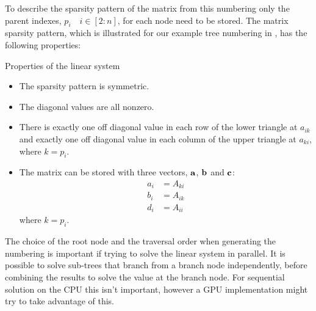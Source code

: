 To describe the sparsity pattern of the matrix from this numbering only the parent indexes, $p_i\quad i\in[2:n]$, for each node need to be stored. The matrix sparsity pattern, which is illustrated for our example tree numbering in , has the following properties:
\begin{infobox}{Properties of the linear system}
\begin{itemize}[leftmargin=*]
    \item
        The sparsity pattern is symmetric.
    \item
        The diagonal values are all nonzero.
    \item
        There is exactly one off diagonal value in each row of the lower triangle at $a_{ik}$ and exactly one off diagonal value in each column of the upper triangle at $a_{ki}$, where $k=p_i$.
    \item
        The matrix can be stored with three vectors, $\mathbf{a}$, $\mathbf{b}$ and $\mathbf{c}$:
        \begin{align}
            a_i &= A_{ki} \\
            b_i &= A_{ik} \\
            d_i &= A_{ii}
        \end{align}
        where $k=p_i$.
\end{itemize}
\end{infobox}

\begin{note}
The choice of the root node and the traversal order when generating the numbering is important if trying to solve the linear system in parallel. It is possible to solve sub-trees that branch from a branch node independently, before combining the results to solve the value at the branch node. For sequential solution on the CPU this isn't important, however a GPU implementation might try to take advantage of this.
\end{note}
